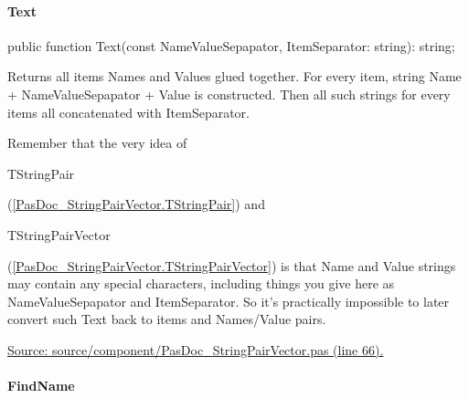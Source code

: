\documentclass{report}
\newif\ifpdf
\begin{document}
\paragraph*{Text}\hspace*{\fill}

\label{PasDoc_StringPairVector.TStringPairVector-Text}
\begin{list}{}{
\setlength{\itemindent}{0cm}
\setlength{\listparindent}{0cm}
\setlength{\leftmargin}{\evensidemargin}
\addtolength{\leftmargin}{\tmplength}
\settowidth{\labelsep}{X}
\addtolength{\leftmargin}{\labelsep}
\setlength{\labelwidth}{\tmplength}
}
\item[\textbf{Declaration}\hfill]
\ifpdf
\begin{flushleft}
\fi
\begin{ttfamily}
public function Text(const NameValueSepapator, ItemSeparator: string): string;\end{ttfamily}

\ifpdf
\end{flushleft}
\fi

\par
\item[\textbf{Description}]
Returns all items Names and Values glued together. For every item, string Name + NameValueSepapator + Value is constructed. Then all such strings for every items all concatenated with ItemSeparator.

Remember that the very idea of \begin{ttfamily}TStringPair\end{ttfamily}(\ref{PasDoc_StringPairVector.TStringPair}) and \begin{ttfamily}TStringPairVector\end{ttfamily}(\ref{PasDoc_StringPairVector.TStringPairVector}) is that Name and Value strings may contain any special characters, including things you give here as NameValueSepapator and ItemSeparator. So it's practically impossible to later convert such Text back to items and Names/Value pairs.\par
\href{https://github.com/pasdoc/pasdoc/blob/master/source/component/PasDoc_StringPairVector.pas#L66}{Source: source/component/PasDoc{\_}StringPairVector.pas (line 66).}

\end{list}
\paragraph*{FindName}\hspace*{\fill}
\end{document}
